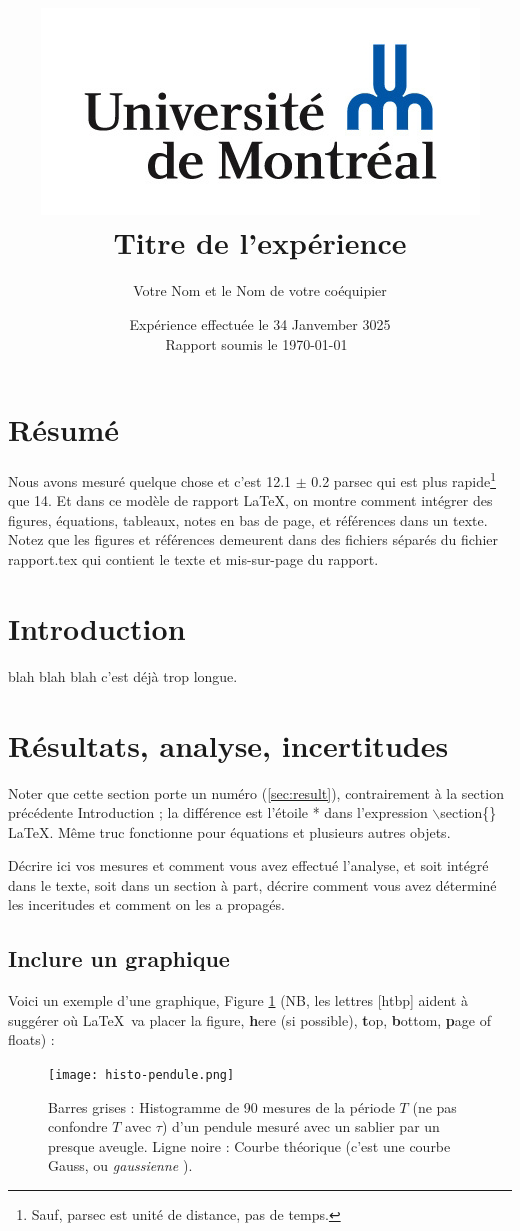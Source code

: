 \documentclass[french,11pt]{article}
\title{\vspace{-1cm}\centering\includegraphics[scale=.8]{UdeM_Hexa.png}  \\\textbf{Titre de l'expérience}}
\author{ Votre Nom et le Nom de votre coéquipier}
\date{Expérience effectuée le 34 Janvember 3025 \\ Rapport soumis le \today\ }
\begin{document}
\renewcommand{\tablename}{Tableau}


\maketitle
\section*{Résumé}
Nous avons mesuré quelque chose et c'est 12.1 $\pm$ 0.2 parsec qui est plus rapide\footnote{Sauf, \og parsec \fg{} est unité de distance, pas de temps.} que 14. Et dans ce modèle de rapport \LaTeX, on montre comment intégrer des figures, équations, tableaux, notes en bas de page, et références dans un texte. Notez que les figures et références demeurent dans des fichiers séparés du fichier rapport.tex qui contient le texte et mis-sur-page du rapport. 
\newpage
\vspace{-1cm}

\section*{Introduction}

blah blah blah c'est déjà trop longue.

\section{Résultats, analyse, incertitudes\label{sec:result}}
Noter que cette section porte un numéro (\ref{sec:result}), contrairement à la section précédente \og Introduction \fg{}; la différence est l'étoile * dans l'expression \og $\backslash$section\{\} \fg{} \LaTeX. Même truc fonctionne pour équations et plusieurs autres objets.

Décrire ici vos mesures et comment vous avez effectué l'analyse, et soit intégré dans le texte, soit dans un section à part, décrire comment vous avez déterminé les inceritudes et comment on les a propagés.

\subsection*{Inclure un graphique}
Voici un exemple d'une graphique, Figure \ref{fig:pendule} (NB, les lettres [htbp] aident à suggérer où \LaTeX \ va placer la figure, \textbf{h}ere (si possible), \textbf{t}op, \textbf{b}ottom, \textbf{p}age of floats) :
\begin{figure}[htbp]
	\begin{center}
		\texttt{[image: histo-pendule.png]}
	\end{center}
	\caption{\label{fig:pendule} Barres grises : Histogramme de 90 mesures de la période $T$ (ne pas confondre $T$ avec $\tau$) d'un pendule mesuré avec un sablier par un presque aveugle. Ligne noire : Courbe théorique (c'est une courbe Gauss, ou \og \textit{gaussienne} \fg{}).}
\end{figure}
\end{document}
